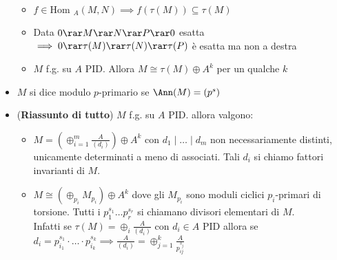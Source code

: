 \documentclass[a4paper,NoNotes,GeneralMath]{stdmdoc}
\newcommand{\Hom}{\text{Hom }}
\begin{document}
\begin{itemize}
			\begin{itemize}
				\item $f \in \Hom_A(M, N) \implies f(\tau(M)) \subseteq \tau(M)$
				\item Data $0 \rar M \rar N \rar P \rar 0$ esatta $\implies 0 \rar \tau(M) \rar \tau(N) \rar \tau(P)$ è esatta ma non a destra
				\item $M$ f.g. su $A$ PID. Allora $M \cong \tau(M) \oplus A^k$ per un qualche $k$
			\end{itemize}
		\item $M$ si dice modulo $p$-primario se $\Ann(M) = (p^s)$
		\item ({\bf Riassunto di tutto}) $M$ f.g. su $A$ PID. allora valgono:
			\begin{itemize}
				\item $M = (\oplus_{i=1}^m \frac{A}{(d_i)}) \oplus A^k$ con $d_1 \mid \ldots \mid d_m$ non necessariamente distinti, unicamente determinati a meno di associati. Tali $d_i$ si chiamo fattori invarianti di $M$.
				\item $M \cong (\oplus_{p_i} M_{p_i}) \oplus A^k$ dove gli $M_{p_i}$ sono moduli ciclici $p_i$-primari di torsione. Tutti i $p_1^{s_1} \ldots p_r^{s_r}$ si chiamano divisori elementari di $M$. \\
				Infatti se $\tau(M) = \oplus_i \frac{A}{(d_i)}$ con $d_i \in A$ PID allora se $d_i = p_{i_1}^{s_1} \cdot \ldots \cdot p_{i_k}^{s_k} \implies \frac{A}{(d_i)} = \oplus_{j=1}^k \frac{A}{p_{ij}^{s_j}}$
			\end{itemize}
	\end{itemize}
	
\end{document}
